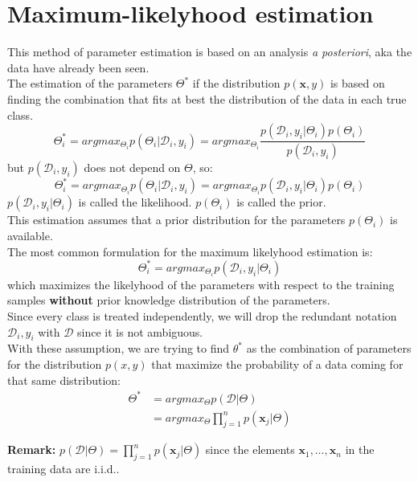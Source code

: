 \section{Maximum-likelyhood estimation}
    \label{par:maximum_likelyhood_estim}
    This method of parameter estimation is based on an analysis \textit{a posteriori}, aka the data have already been seen.\\
    The estimation of the parameters $\Theta^*$ if the distribution $p(\pmb{x}, y)$ is based on finding the combination that fits at best the distribution of the data in each true class.
    $$\Theta_i^* = argmax_{\Theta_i} p(\Theta_i|\mathcal{D}_i, y_i) = argmax_{\Theta_i} \frac{p(\mathcal{D}_i, y_i|\Theta_i)p(\Theta_i)}{p(\mathcal{D}_i, y_i)}$$
    but $p(\mathcal{D}_i, y_i)$ does not depend on $\Theta$, so:
    $$\Theta_i^* = argmax_{\Theta_i} p(\Theta_i|\mathcal{D}_i, y_i) = argmax_{\Theta_i} p(\mathcal{D}_i, y_i|\Theta_i)p(\Theta_i)$$
    $p(\mathcal{D}_i, y_i|\Theta_i)$ is called the likelihood. $p(\Theta_i)$ is called the prior.\\
    This estimation assumes that a prior distribution for the parameters $p(\Theta_i)$ is available.\\
    The most common formulation for the maximum likelyhood estimation is:
    \begin{equation}
        \Theta_i^* = argmax_{\Theta_i} p(\mathcal{D}_i, y_i| \Theta_i)
        \label{eq:max_likelyhood_common}
    \end{equation}
    which maximizes the likelyhood of the parameters with respect to the training samples\textbf{ without } prior knowledge distribution of the parameters.\\
    
    Since every class is treated independently, we will drop the redundant notation $\mathcal{D}_i, y_i$ with $\mathcal{D}$ since it is not ambiguous.\\
    
    With these assumption, we are trying to find $\theta^*$ as the combination of parameters for the distribution $p(x, y)$ that maximize the probability of a data coming for that same distribution:
    \begin{align*}
		\Theta^* &= argmax_{\Theta} p(\mathcal{D} | \Theta)\\
		&= argmax_\Theta \prod_{j=1}^n p(\pmb{x}_j|\Theta)
	\end{align*}
	
	\textbf{Remark:}
	$p(\mathcal{D}| \Theta) = \prod_{j=1}^n p(\pmb{x}_j|\Theta)$ since the elements $\pmb{x}_1, \hdots, \pmb{x}_n$ in the training data are i.i.d..
    

